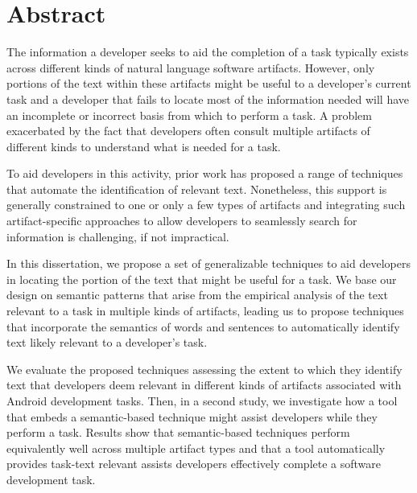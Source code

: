 

\chapter*{Abstract}


\vspace{-8mm}
The information a developer seeks to aid the completion of a task typically exists across different kinds of natural language software artifacts. However, only portions of the text within these artifacts might be useful to a developer's current task and a developer that fails to locate most of the information needed will have an incomplete or incorrect basis from which to perform a task. A problem exacerbated by the fact that developers often consult multiple artifacts of different kinds to understand what is needed for a task.


To aid developers in this activity, prior work has proposed a range of techniques that automate the identification of relevant text. Nonetheless, this support is generally constrained to one or only a few types of artifacts and integrating such artifact-specific approaches to allow developers to seamlessly search for information is challenging, if not impractical.


In this dissertation, we propose a set of generalizable techniques to aid developers in locating the portion of the text that might be useful for a task. We base our design on semantic patterns that arise from the empirical analysis of the text relevant to a task in multiple kinds of artifacts, leading us to propose techniques that incorporate the semantics of words and sentences to automatically identify text likely relevant to a developer's task.


We evaluate the proposed techniques assessing the extent to which they identify text that developers deem relevant in different kinds of artifacts associated with Android development tasks. Then, in a second study, we investigate how a tool that embeds a semantic-based technique might assist developers while they perform a task. Results show that semantic-based techniques perform equivalently well across multiple artifact types and that a tool automatically provides task-text relevant assists developers effectively complete a software development task.




